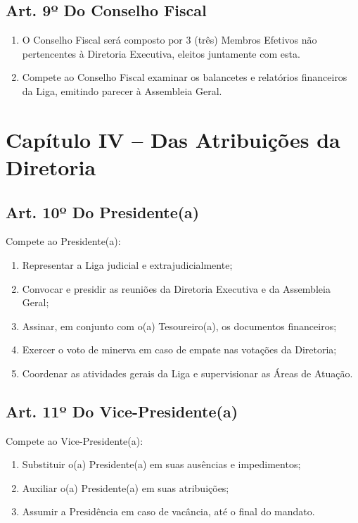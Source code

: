 \documentclass[12pt, a4paper]{article}
\begin{document}
\subsection{Art. 9º Do Conselho Fiscal}
\begin{enumerate}[label=\S \arabic*.]
    \item O Conselho Fiscal será composto por 3 (três) Membros Efetivos não pertencentes à Diretoria Executiva, eleitos juntamente com esta.
    \item Compete ao Conselho Fiscal examinar os balancetes e relatórios financeiros da Liga, emitindo parecer à Assembleia Geral.
\end{enumerate}


\section{Capítulo IV – Das Atribuições da Diretoria}


\subsection{Art. 10º Do Presidente(a)}
Compete ao Presidente(a):
\begin{enumerate}[label=\alph*)]
    \item Representar a Liga judicial e extrajudicialmente;
    \item Convocar e presidir as reuniões da Diretoria Executiva e da Assembleia Geral;
    \item Assinar, em conjunto com o(a) Tesoureiro(a), os documentos financeiros;
    \item Exercer o voto de minerva em caso de empate nas votações da Diretoria;
    \item Coordenar as atividades gerais da Liga e supervisionar as Áreas de Atuação.
\end{enumerate}

\subsection{Art. 11º Do Vice-Presidente(a)}
Compete ao Vice-Presidente(a):
\begin{enumerate}[label=\alph*)]
    \item Substituir o(a) Presidente(a) em suas ausências e impedimentos;
    \item Auxiliar o(a) Presidente(a) em suas atribuições;
    \item Assumir a Presidência em caso de vacância, até o final do mandato.
\end{enumerate}
\end{document}
